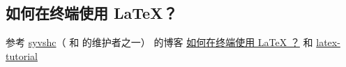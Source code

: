 
\subsection{如何在终端使用 \LaTeX ？}

参考 \href{https://github.com/syvshc}{syvshc}（ 和  的维护者之一） 的博客 \href{https://syvshc.github.io/2022-03-06-latex-terminal-compiling}{如何在终端使用 LaTeX ？} 和 \href{https://syvshc.github.io/2022-04-20-latex-tutorial/}{latex-tutorial}